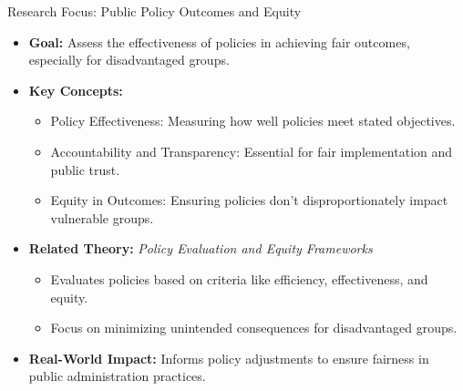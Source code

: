 \documentclass[11pt, aspectratio=169]{beamer}
\begin{document}
\begin{frame}{Research Focus: Public Policy Outcomes and Equity}
    \begin{itemize}
        \item \textbf{Goal:} Assess the effectiveness of policies in achieving fair outcomes, especially for disadvantaged groups.
        \item \textbf{Key Concepts:}
            \begin{itemize}
                \item Policy Effectiveness: Measuring how well policies meet stated objectives.
                \item Accountability and Transparency: Essential for fair implementation and public trust.
                \item Equity in Outcomes: Ensuring policies don’t disproportionately impact vulnerable groups.
            \end{itemize}
        \item \textbf{Related Theory:} \textit{Policy Evaluation and Equity Frameworks}
            \begin{itemize}
                \item Evaluates policies based on criteria like efficiency, effectiveness, and equity.
                \item Focus on minimizing unintended consequences for disadvantaged groups.
            \end{itemize}
        \item \textbf{Real-World Impact:} Informs policy adjustments to ensure fairness in public administration practices.
    \end{itemize}
\end{frame}
\end{document}
